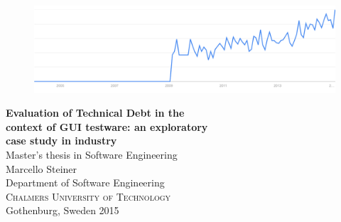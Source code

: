 
\begin{titlepage}
			
\addtolength{\voffset}{2cm}

\begin{figure}[h]
\centering
\includegraphics[width=\textwidth]{figure/technicalDebt.pdf}
\label{fig:technical_debt_trend}
\end{figure}

\mbox{}
\vfill
\renewcommand{\familydefault}{\sfdefault} \normalfont %
\textbf{{\Huge 	Evaluation of Technical Debt in the  	\\[0.2cm] 
                context of GUI testware: an exploratory \\[0.2cm] 
				case study in industry}} 	\\[0.5cm]
Master's thesis in Software Engineering \\[0.5cm]

{\Large Marcello Steiner}\\[2.5cm]

Department of Software Engineering \\
\textsc{Chalmers University of Technology} \\
Gothenburg, Sweden 2015

\renewcommand{\familydefault}{\rmdefault} \normalfont %
\end{titlepage}


\newpage
\restoregeometry
\thispagestyle{empty}
\mbox{}


